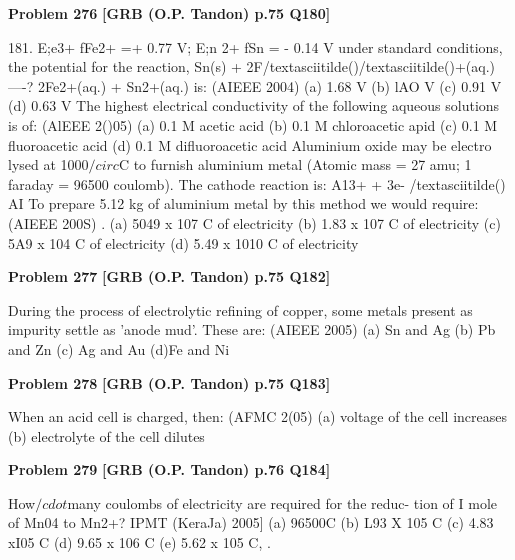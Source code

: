 \begin{problembox}
\textbf{Problem 276} \hfill \textbf{[GRB (O.P. Tandon) p.75 Q180]}
\label{q:ext-grb_all_questions-276}

181. 
E;e3+ fFe2+ =+ 0.77 V; E;n 2+ fSn = - 0.14 V 
under standard conditions, the potential for the reaction, 
Sn(s) + 2F/textasciitilde()/textasciitilde()+(aq.) ----? 2Fe2+(aq.) + Sn2+(aq.) is: 
(AIEEE 2004) 
(a) 1.68 V 
(b) lAO V 
(c) 0.91 V 
(d) 0.63 V 
The highest electrical conductivity of the following aqueous 
solutions is of: 
(AlEEE 2()05) 
(a) 0.1 M acetic acid 
(b) 0.1 M chloroacetic apid 
(c) 0.1 M fluoroacetic acid 
(d) 0.1 M difluoroacetic acid 
Aluminium oxide may be electro lysed at 1000$/circ$C to furnish 
aluminium metal (Atomic mass = 27 amu; 1 faraday = 96500 
coulomb). The cathode reaction is: 
A13+ + 3e- /textasciitilde() 
AI 
To prepare 5.12 kg of aluminium metal by this method we 
would require: 
(AIEEE 200S) . 
(a) 5049 x 107 C of electricity (b) 1.83 x 107 C of electricity 
(c) 5A9 x 104 C of electricity (d) 5.49 x 1010 C of electricity
\end{problembox}

\begin{problembox}
\textbf{Problem 277} \hfill \textbf{[GRB (O.P. Tandon) p.75 Q182]}
\label{q:ext-grb_all_questions-277}

During the process of electrolytic refining of copper, some 
metals present as impurity settle as 'anode mud'. These are: 
(AIEEE 2005) 
(a) Sn and Ag 
(b) Pb and Zn 
(c) Ag and Au 
(d)Fe and Ni
\end{problembox}

\begin{problembox}
\textbf{Problem 278} \hfill \textbf{[GRB (O.P. Tandon) p.75 Q183]}
\label{q:ext-grb_all_questions-278}

When an acid cell is charged, then: 
(AFMC 2(05) 
(a) voltage of the cell increases 
(b) electrolyte of the cell dilutes
\end{problembox}

\begin{problembox}
\textbf{Problem 279} \hfill \textbf{[GRB (O.P. Tandon) p.76 Q184]}
\label{q:ext-grb_all_questions-279}

How$/cdot$many coulombs of electricity are required for the reduc-
tion of I mole of Mn04 to Mn2+? 
IPMT (KeraJa) 2005] 
(a) 96500C 
(b) L93 X 105 C 
(c) 4.83 xI05 C 
(d) 9.65 x 106 C 
(e) 5.62 x 105 C, .
\end{problembox}

